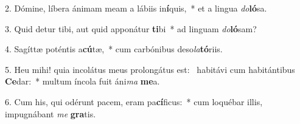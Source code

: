 2. Dómine, líbera ánimam meam a lábiis in\textbf{í}quis,~*  et a lingua \textit{do}\textbf{ló}sa.\

3. Quid detur tibi, aut quid apponátur \textbf{ti}bi~*  ad linguam \textit{do}\textbf{ló}sam?\

4. Sagíttæ poténtis a\textbf{cú}tæ,~*  cum carbónibus deso\textit{la}\textbf{tó}riis.\

5. Heu mihi! quia incolátus meus prolongátus est: \dag\  habitávi cum habitántibus \textbf{Ce}dar:~*  multum íncola fuit áni\textit{ma} \textbf{me}a.\

6. Cum his, qui odérunt pacem, eram pa\textbf{cí}ficus:~*  cum loquébar illis, impugnábant \textit{me} \textbf{gra}tis.\


